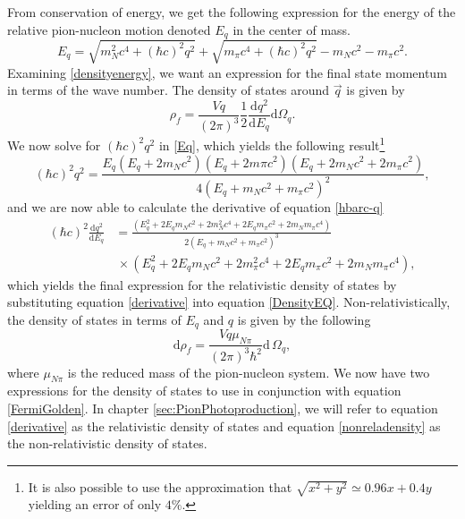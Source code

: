 From conservation of energy, we get the following expression for the energy of the relative pion-nucleon motion denoted $E_q$ in the center of mass. 
\begin{equation} \label{Eq}
	E_q = \sqrt{m_N^2 c^4+(\hbar c)^2q^2} + \sqrt{m_\pi c^4+(\hbar c)^2 q^2}-m_N c^2-m_\pi c^2.
\end{equation}
Examining \eqref{densityenergy}, we want an expression for the final state momentum in terms of the wave number. The density of states around $\vec{q}$ is given by
\begin{equation} \label{DensityEQ}
	\rho_f = \frac{Vq}{(2\pi)^3}\frac{1}{2}\frac{\text{d}q^2}{\text{d}E_q} \text{d}\Omega_q.
\end{equation}
We now solve for $(\hbar c)^2q^2$ in \eqref{Eq}, which yields the following result\footnote{It is also possible to use the approximation that $\sqrt{x^2+y^2}\simeq 0.96x+0.4y$ yielding an error of only $4\%$.}
\begin{equation} \label{hbarc-q}
	(\hbar c)^2 q^2 = \frac{E_q(E_q+2m_N c^2)(E_q+2m\pi c^2)(E_q+2m_N c^2+2m_\pi c^2)}{4(E_q+m_N c^2+m_\pi c^2)^2},
\end{equation}
and we are now able to calculate the derivative of equation \eqref{hbarc-q}
\begin{equation}\begin{split} \label{derivative}
		(\hbar c)^2\frac{\text{d}q^2}{\text{d}E_q} &= \frac{(E_q^2+2E_q m_N c^2+2m_N^2 c^4+2E_q m_\pi c^2+2m_N m_\pi c^4)}{2(E_q+m_N c^2+m_\pi c^2)^3} \\
		& \, \times (E_q^2+2E_q m_N c^2 +2m_\pi^2 c^4 +2E_q m_\pi c^2+2m_N m_\pi c^4),
	\end{split}
\end{equation} 
which yields the final expression for the relativistic density of states by substituting equation \eqref{derivative} into equation \eqref{DensityEQ}. Non-relativistically, the density of states in terms of $E_q$ and $q$ is given by the following 
\begin{equation}\label{nonreladensity}
	\text{d}\rho_f = \frac{Vq\mu_{N\pi}}{(2\pi)^3\hbar^2} \text{d}\,\Omega_q,
\end{equation}
where $\mu_{N\pi}$ is the reduced mass of the pion-nucleon system. We now have two expressions for the density of states to use in conjunction with equation \eqref{FermiGolden}. In chapter \ref{sec:PionPhotoproduction}, we will refer to equation \eqref{derivative} as the relativistic density of states and equation \eqref{nonreladensity} as the non-relativistic density of states.

